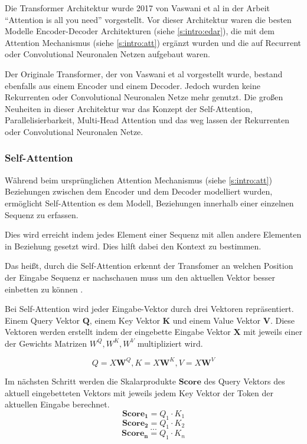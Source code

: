 Die Transformer Architektur wurde 2017 von Vaswani et al in der Arbeit ``Attention is all you need''
vorgestellt. Vor dieser Architektur waren die besten Modelle Encoder-Decoder Architekturen (siehe \ref{s:intro:edar}), 
die mit dem Attention Mechanismus (siehe \ref{s:intro:att}) ergänzt wurden und
 die auf Recurrent oder Convolutional Neuronalen Netzen
aufgebaut waren. \par
Der Originale Transformer, der von Vaswani et al vorgestellt wurde, bestand ebenfalls aus einem 
Encoder und einem Decoder. Jedoch wurden keine Rekurrenten oder Convolutional Neuronalen Netze mehr 
genutzt. 
Die großen Neuheiten in dieser Architektur war das Konzept der Self-Attention, Parallelisierbarkeit, 
Multi-Head Attention und das weg lassen der Rekurrenten oder Convolutional Neuronalen
Netze. \cite{vaswaniAttentionAllYou2023}

\subsubsection{Self-Attention}
Während beim ursprünglichen Attention Mechanismus (siehe \ref*{s:intro:att}) Beziehungen 
zwischen dem Encoder und dem Decoder modelliert wurden, ermöglicht Self-Attention es dem Modell, 
 Beziehungen innerhalb einer einzelnen Sequenz zu erfassen. \par
Dies wird erreicht indem jedes Element einer Sequenz mit allen andere Elementen in Beziehung 
gesetzt wird. Dies hilft dabei den Kontext zu bestimmen. \par
Das heißt, durch die Self-Attention erkennt der Transfomer an welchen Position der
Eingabe Sequenz er nachschauen muss um den aktuellen Vektor besser 
einbetten zu können \cite{vaswaniAttentionAllYou2023, alammarIllustratedTransformer}.\par
Bei Self-Attention wird jeder Eingabe-Vektor durch drei Vektoren repräsentiert.
Einem Query Vektor $\mathbf{Q}$, einem Key Vektor $\mathbf{K}$ und einem Value Vektor $\mathbf{V}$.
Diese Vektoren werden erstellt indem der eingebette Eingabe Vektor $\mathbf{X}$ mit jeweils einer
der Gewichts Matrizen $W^Q, W^K, W^V$ multipliziert wird.\par
\[Q = X\mathbf{W}^Q, K = X\mathbf{W}^K, V = X\mathbf{W}^V\]

Im nächsten Schritt werden die Skalarprodukte $\mathbf{Score}$
des Query Vektors des aktuell eingebetteten Vektors mit 
jeweils jedem Key Vektor der Token der aktuellen Eingabe berechnet.
\[\mathbf{Score_1}=Q_1 \cdot K_1\]
\[\mathbf{Score_2}=Q_1 \cdot K_2\]
\[...\]
\[\mathbf{Score_n}=Q_1 \cdot K_n\]


